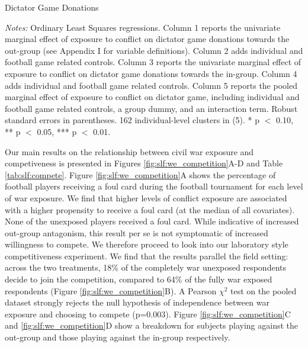 \begin{threeparttable}[htb]
	\caption{Dictator Game Donations}
	\label{tab:slf:dictator}
	\centering
	\tiny
	
	\begin{tablenotes}
		\item \textit{Notes:} Ordinary Least Squares regressions. Column 1 reports the univariate marginal effect of exposure to conflict on dictator game donations towards the out-group (see Appendix I for variable definitions). Column 2 adds individual and football game related controls. Column 3 reports the univariate marginal effect of exposure to conflict on dictator game donations towards the in-group. Column 4 adds individual and football game related controls. Column 5 reports the pooled marginal effect of exposure to conflict on dictator game, including individual and football game related controls, a group dummy, and an interaction term. Robust standard errors in parentheses. 162 individual-level clusters in (5). * p $<$ 0.10, ** p $<$ 0.05, *** p $<$ 0.01.
		\item
	\end{tablenotes}
\end{threeparttable}

Our main results on the relationship between civil war exposure and competiveness is presented in Figures \ref{fig:slf:we_competition}A-D and Table \ref{tab:slf:compete}. Figure \ref{fig:slf:we_competition}A shows the percentage of football players receiving a foul card during the football tournament for each level of war exposure. We find that higher levels of conflict exposure are associated with a higher propensity to receive a foul card (at the median of all covariates). None of the unexposed players received a foul card. While indicative of increased out-group antagonism, this result per se is not symptomatic of increased willingness to compete. We therefore proceed to look into our laboratory style competitiveness experiment. We find that the results parallel the field setting: across the two treatments, 18\% of the completely war unexposed respondents decide to join the competition, compared to 64\% of the fully war exposed respondents (Figure \ref{fig:slf:we_competition}B). A Pearson $\chi^2$ test on the pooled dataset strongly rejects the null hypothesis of independence between war exposure and choosing to compete (p=0.003). Figure \ref{fig:slf:we_competition}C and \ref{fig:slf:we_competition}D show a breakdown for subjects playing against the out-group and those playing against the in-group respectively. 

